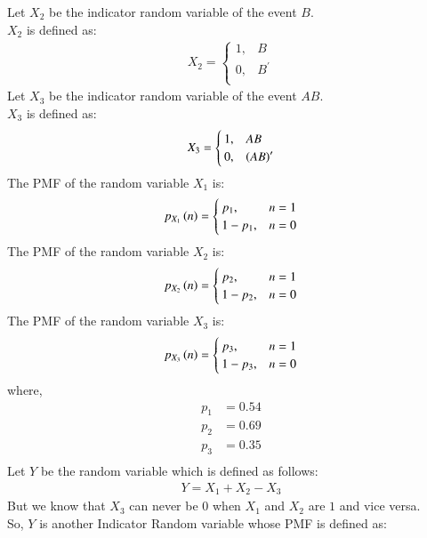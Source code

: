 \documentclass[journal]{IEEEtran}
\begin{document}
Let $X_2$ be the indicator random variable of the event $B$.\\
$X_2$ is defined as:
\begin{align}
	X_2 =
	\begin{cases}
		1 ,& B\\
		0 ,& B^\prime\\
	\end{cases}
\end{align}
Let $X_3$ be the indicator random variable of the event $AB$.\\
$X_3$ is defined as:
\begin{align}
	X_3 =
	\begin{cases}
		1 ,& AB\\
		0 ,& \left(AB\right)^\prime\\
	\end{cases}
\end{align}
The PMF of the random variable $X_1$ is:
\begin{align}
	p_{X_1}\left(n\right) =
	\begin{cases}
		p_1 ,& n = 1\\
		1 - p_1 ,& n = 0
	\end{cases}
\end{align}
The PMF of the random variable $X_2$ is:
\begin{align}
	p_{X_2}\left(n\right) =
	\begin{cases}
		p_2 ,& n = 1\\
		1 - p_2 ,& n = 0
	\end{cases}
\end{align}
The PMF of the random variable $X_3$ is:
\begin{align}
	p_{X_3}\left(n\right) =
	\begin{cases}
		p_3 ,& n = 1\\
		1 - p_3 ,& n = 0
	\end{cases}
\end{align}
where,
\begin{align}
	p_1 &= 0.54\\
	p_2 &= 0.69\\
	p_3 &= 0.35\\
\end{align}
Let $Y$ be the random variable which is defined as follows:
\begin{align}
	Y = X_1 + X_2 - X_3
\end{align}
But we know that $X_3$ can never be $0$ when $X_1$ and $X_2$ are $1$ and vice versa.\\
So, $Y$ is another Indicator Random variable whose PMF is defined as:
\end{document}
